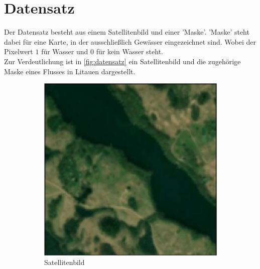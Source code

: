 \section{Datensatz}
\label{sec:Datensatz}
Der Datensatz besteht aus einem Satellitenbild und einer 'Maske'.
'Maske' steht dabei für eine Karte, in der ausschließlich Gewässer eingezeichnet sind.
Wobei der Pixelwert $1$ für Wasser und $0$ für kein Wasser steht.
\\
Zur Verdeutlichung ist in \autoref{fig:datensatz} ein Satellitenbild und die zugehörige Maske eines Flusses in Litauen dargestellt.
\begin{figure}
    \begin{subfigure}{0.48\textwidth}
        \centering
        \includegraphics[width=\textwidth]{content/img/datensatz_satellite.jpg}
        \caption{Satellitenbild}
    \end{subfigure}
    \hfill
    \begin{subfigure}{0.48\textwidth}
        \centering

\end{subfigure}
\end{figure}
